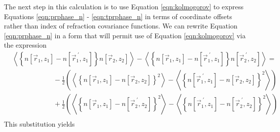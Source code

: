 The next step in this calculation is to use Equation \ref{eqn:kolmogorov}
to express Equations \ref{eqn:prphase_n} - \ref{eqn:tprphase_n} in terms of
coordinate offsets rather than index of refraction covariance
functions.  We can rewrite Equation \ref{eqn:prphase_n} in a form that
will permit use of Equation \ref{eqn:kolmogorov} via the expression
\begin{equation}\label{eqn:simplify}
\begin{split}
&\left\langle \left\{n\left[\vec{r}_{1},z_{1}\right] - n\left[\vec{r}^{\;\prime}_{1},z_{1}\right]\right\}n\left[\vec{r}_{2},z_{2}\right]\right\rangle -
\left\langle \left\{n\left[\vec{r}_{1},z_{1}\right] - n\left[\vec{r}^{\;\prime}_{1},z_{1}\right]\right\}n\left[\vec{r}^{\;\prime}_{2},z_{2}\right]\right\rangle = \\
&\quad\quad\quad\quad\quad\quad
-\frac{1}{2} \left(\left\langle \left\{n\left[\vec{r}_{1},z_{1}\right] - n\left[\vec{r}_{2},z_{2}\right]\right\}^{2}\right\rangle - 
\left\langle \left\{n\left[\vec{r}^{\;\prime}_{1},z_{1}\right] - n\left[\vec{r}_{2},z_{2}\right]\right\}^{2}\right\rangle\right) \\
&\quad\quad\quad\quad\quad\quad
+\frac{1}{2} \left(\left\langle \left\{n\left[\vec{r}_{1},z_{1}\right] - n\left[\vec{r}^{\;\prime}_{2},z_{2}\right]\right\}^{2}\right\rangle - 
\left\langle \left\{n\left[\vec{r}^{\;\prime}_{1},z_{1}\right] - n\left[\vec{r}^{\;\prime}_{2},z_{2}\right]\right\}^{2}\right\rangle\right) \\
\end{split}
\end{equation}
This substitution yields
